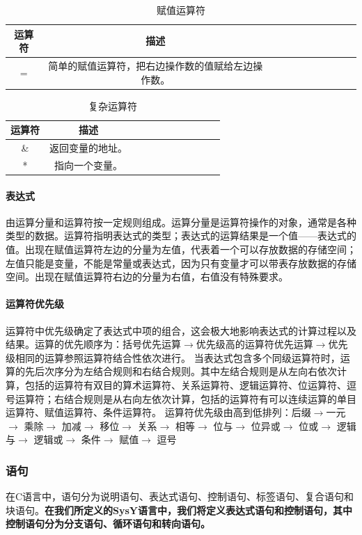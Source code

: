 \documentclass[UTF8,a4paper,10pt]{ctexart}
\begin{document}
\begin{table}[!htbp]
  \centering
  \begin{tabular}{ccccccccccc}
  \toprule  
  运算符& 描述&\\
  \midrule
  =& 简单的赋值运算符，把右边操作数的值赋给左边操作数。&\\
  \bottomrule
  \end{tabular}
  \caption{赋值运算符}
\end{table}
\begin{table}[!htbp]
  \centering
  \begin{tabular}{ccccccccccc}
  \toprule  
  运算符& 描述&\\
  \midrule
  \& & 返回变量的地址。&\\
  * & 指向一个变量。&\\
  \bottomrule
  \end{tabular}
  \caption{复杂运算符}
\end{table}
\paragraph{表达式}由运算分量和运算符按一定规则组成。运算分量是运算符操作的对象，通常是各种类型的数据。运算符指明表达式的类型；表达式的运算结果是一个值——表达式的值。出现在赋值运算符左边的分量为左值，代表着一个可以存放数据的存储空间；左值只能是变量，不能是常量或表达式，因为只有变量才可以带表存放数据的存储空间。出现在赋值运算符右边的分量为右值，右值没有特殊要求。
\paragraph{运算符优先级}运算符中优先级确定了表达式中项的组合，这会极大地影响表达式的计算过程以及结果。运算的优先顺序为：括号优先运算$\rightarrow$优先级高的运算符优先运算$\rightarrow$优先级相同的运算参照运算符结合性依次进行。
当表达式包含多个同级运算符时，运算的先后次序分为左结合规则和右结合规则。其中左结合规则是从左向右依次计算，包括的运算符有双目的算术运算符、关系运算符、逻辑运算符、位运算符、逗号运算符；右结合规则是从右向左依次计算，包括的运算符有可以连续运算的单目运算符、赋值运算符、条件运算符。
运算符优先级由高到低排列：后缀$\rightarrow$一元 $\rightarrow$
乘除$\rightarrow$
加减$\rightarrow$
移位$\rightarrow$ 
关系$\rightarrow$
相等$\rightarrow$
位与$\rightarrow$
位异或$\rightarrow$
位或$\rightarrow$
逻辑与$\rightarrow$
逻辑或$\rightarrow$
条件$\rightarrow$
赋值$\rightarrow$
逗号
\subsubsection{语句}
在C语言中，语句分为说明语句、表达式语句、控制语句、标签语句、复合语句和块语句。\textbf{在我们所定义的SysY语言中，我们将定义表达式语句和控制语句，其中控制语句分为分支语句、循环语句和转向语句。}
\end{document}
